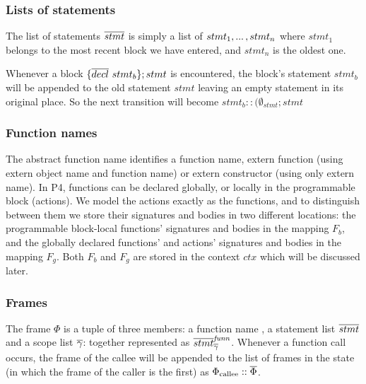 \documentclass[UTF8]{article}
\begin{document}

\subsubsection*{Lists of statements}
The list of statements $\overline{stmt}$ is simply a list of $stmt_1 , ... \, , stmt_n$ where $stmt_1$ belongs to the most recent block we have entered, and $stmt_n$ is the oldest one.

Whenever a block $\{ \overline{decl} \ stmt_b \} ; stmt$ is encountered, the block's statement $stmt_b$ will be appended to the old statement $stmt$ leaving an empty statement in its original place. So the next transition will become $stmt_b::(\emptyset_{stmt}; stmt$ 

\subsubsection*{Function names}
The abstract function name \funn{} identifies a function name, extern function (using extern object name and function name) or extern constructor (using only extern name). In P4, functions can be declared globally, or locally in the programmable block (actions). We model the actions exactly as the functions, and to distinguish between them we store their signatures and bodies in two different locations: the programmable block-local functions' signatures and bodies in the mapping $F_b$, and the globally declared functions' and actions' signatures and bodies in the mapping $F_g$. Both $F_b$ and $F_g$ are stored in the context $ctx$ which will be discussed later.

\subsubsection*{Frames}
The frame $\Phi$ is a tuple of three members: a function name \funn{}, a statement list $\overline{stmt}$ and a scope list $\overline{\gamma}$: together represented as $ \overline{stmt}^{\mathit{funn}}_{\overline{\gamma}{}} $. Whenever a function call occurs, the frame of the callee will be appended to the list of frames in the state (in which the frame of the caller is the first) as $\Phi_{\mathrm{callee}} :: \overline{\Phi} $.
\end{document}
